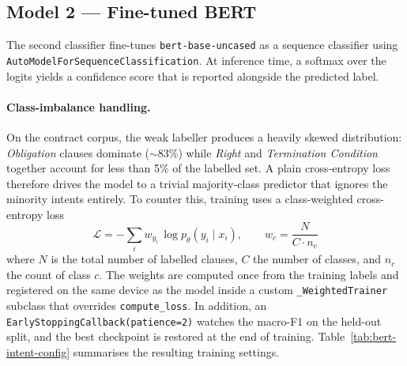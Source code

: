 \documentclass[assignment.tex]{subfiles}
\begin{document}
\subsection{Model 2 — Fine-tuned BERT}

The second classifier fine-tunes \texttt{bert-base-uncased} as a sequence
classifier using \texttt{AutoModelForSequenceClassification}.  At inference
time, a softmax over the logits yields a confidence score that is reported
alongside the predicted label.

\paragraph{Class-imbalance handling.}
On the contract corpus, the weak labeller produces a heavily skewed
distribution: \emph{Obligation} clauses dominate ($\sim$83\%) while
\emph{Right} and \emph{Termination Condition} together account for less
than 5\% of the labelled set.  A plain cross-entropy loss therefore drives
the model to a trivial majority-class predictor that ignores the minority
intents entirely.  To counter this, training uses a class-weighted
cross-entropy loss
\[
\mathcal{L} = -\sum_{i} w_{y_i}\,\log p_{\theta}(y_i \mid x_i),
\qquad
w_c = \frac{N}{C \cdot n_c}
\]
where $N$ is the total number of labelled clauses, $C$ the number of
classes, and $n_c$ the count of class $c$.  The weights are computed once
from the training labels and registered on the same device as the model
inside a custom \texttt{\_WeightedTrainer} subclass that overrides
\texttt{compute\_loss}.  In addition, an
\texttt{EarlyStoppingCallback(patience=2)} watches the macro-F1 on the
held-out split, and the best checkpoint is restored at the end of training.
Table~\ref{tab:bert-intent-config} summarises the resulting training
settings.
\end{document}
